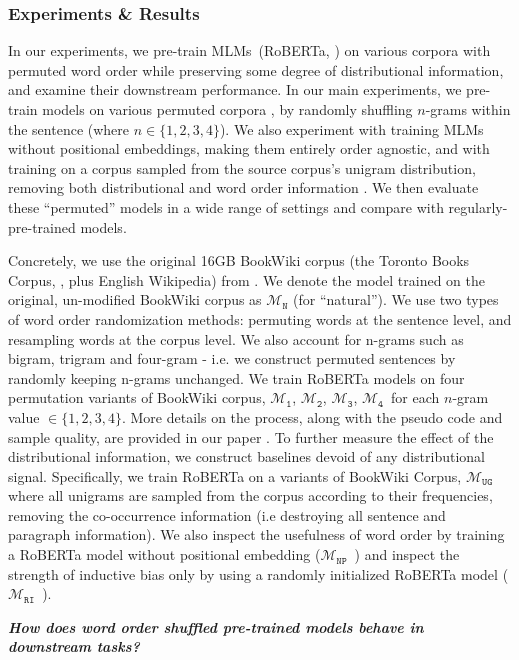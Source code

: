 \documentclass[12pt]{article}
\newcommand{\xit}[1]{{\noindent\textbf{\textit{#1}}}}
\newcommand{\OR}{$\mathcal{M}_{\texttt{N}}$}
\newcommand{\RI}{$\mathcal{M}_{\texttt{1}}$}
\newcommand{\RII}{$\mathcal{M}_{\texttt{2}}$}
\newcommand{\RIII}{$\mathcal{M}_{\texttt{3}}$}
\newcommand{\RIV}{$\mathcal{M}_{\texttt{4}}$}
\newcommand{\RC}{$\mathcal{M}_{\texttt{UG}}$}
\newcommand{\RT}{$\mathcal{M}_{\texttt{RI}}$}
\newcommand{\NP}{$\mathcal{M}_{\texttt{NP}}$}
\begin{document}
\subsubsection{Experiments \& Results}

In our experiments, we pre-train MLMs~(RoBERTa, \citealt{liu2019b}) on various corpora with permuted word order while preserving some degree of distributional information, and examine their downstream performance.
In our main experiments, we pre-train models on various permuted corpora , by randomly shuffling $n$-grams within the sentence (where $n \in \{1,2,3,4\}$).
We also experiment with training MLMs without positional embeddings, making them entirely order agnostic,
and with training on a corpus sampled from the source corpus's %
unigram distribution, removing both distributional and word order information
. We then evaluate these ``permuted'' models in a wide range of settings and compare with regularly-pre-trained models.

Concretely, we use the original 16GB BookWiki corpus (the Toronto Books Corpus, \cite{zhu2015aligning}, plus English Wikipedia) from \cite{liu2019b}. We denote the model trained on the original, un-modified BookWiki corpus as \OR{} (for ``natural''). We use two types of word order randomization methods: permuting words at the sentence level, and resampling words at the corpus level. We also account for n-grams such as bigram, trigram and four-gram - i.e. we construct permuted sentences by randomly keeping n-grams unchanged. We train RoBERTa models on four permutation variants of BookWiki corpus, \RI, \RII, \RIII, \RIV\ for each $n$-gram value $ \in {\{1,2,3,4\}}$. More details on the process, along with the pseudo code and sample quality, are provided in our paper \cite{sinha2021a}. To further measure the effect of the distributional information, we construct baselines devoid of any distributional signal. Specifically, we train RoBERTa on a variants of BookWiki Corpus, \RC\, where all unigrams are sampled from the corpus according to their frequencies, removing the co-occurrence information (i.e destroying all sentence and paragraph information). We also inspect the usefulness of word order by training a RoBERTa model without positional embedding (\NP\ ) and inspect the strength of inductive bias only by using a randomly initialized RoBERTa model (\RT\ ).

\blankline

\xit{How does word order shuffled pre-trained models behave in downstream tasks?}
\end{document}
